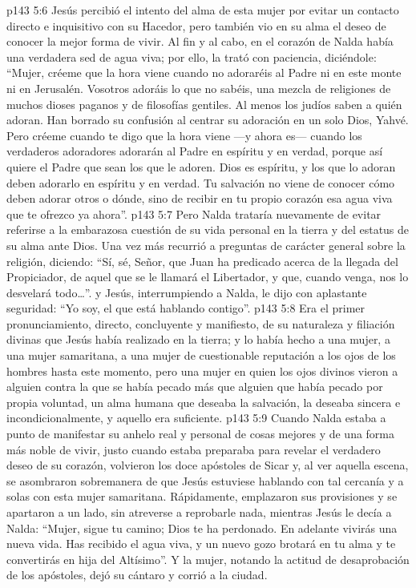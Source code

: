 \vs p143 5:6 Jesús percibió el intento del alma de esta mujer por evitar un contacto directo e inquisitivo con su Hacedor, pero también vio en su alma el deseo de conocer la mejor forma de vivir. Al fin y al cabo, en el corazón de Nalda había una verdadera sed de agua viva; por ello, la trató con paciencia, diciéndole: “Mujer, créeme que la hora viene cuando no adoraréis al Padre ni en este monte ni en Jerusalén. Vosotros adoráis lo que no sabéis, una mezcla de religiones de muchos dioses paganos y de filosofías gentiles. Al menos los judíos saben a quién adoran. Han borrado su confusión al centrar su adoración en un solo Dios, Yahvé. Pero créeme cuando te digo que la hora viene ---y ahora es--- cuando los verdaderos adoradores adorarán al Padre en espíritu y en verdad, porque así quiere el Padre que sean los que le adoren. Dios es espíritu, y los que lo adoran deben adorarlo en espíritu y en verdad. Tu salvación no viene de conocer cómo deben adorar otros o dónde, sino de recibir en tu propio corazón esa agua viva que te ofrezco ya ahora”.
\vs p143 5:7 Pero Nalda trataría nuevamente de evitar referirse a la embarazosa cuestión de su vida personal en la tierra y del estatus de su alma ante Dios. Una vez más recurrió a preguntas de carácter general sobre la religión, diciendo: “Sí, sé, Señor, que Juan ha predicado acerca de la llegada del Propiciador, de aquel que se le llamará el Libertador, y que, cuando venga, nos lo desvelará todo\ldots ”. y Jesús, interrumpiendo a Nalda, le dijo con aplastante seguridad: “Yo soy, el que está hablando contigo”.
\vs p143 5:8 Era el primer pronunciamiento, directo, concluyente y manifiesto, de su naturaleza y filiación divinas que Jesús había realizado en la tierra; y lo había hecho a una mujer, a una mujer samaritana, a una mujer de cuestionable reputación a los ojos de los hombres hasta este momento, pero una mujer en quien los ojos divinos vieron a alguien contra la que se había pecado más que alguien que había pecado por propia voluntad, un alma humana que  deseaba la salvación, la deseaba sincera e incondicionalmente, y aquello era suficiente.
\vs p143 5:9 Cuando Nalda estaba a punto de manifestar su anhelo real y personal de cosas mejores y de una forma más noble de vivir, justo cuando estaba preparaba para revelar el verdadero deseo de su corazón, volvieron los doce apóstoles de Sicar y, al ver aquella escena, se asombraron sobremanera de que Jesús estuviese hablando con tal cercanía y a solas con esta mujer samaritana. Rápidamente, emplazaron sus provisiones y se apartaron a un lado, sin atreverse a reprobarle nada, mientras Jesús le decía a Nalda: “Mujer, sigue tu camino; Dios te ha perdonado. En adelante vivirás una nueva vida. Has recibido el agua viva, y un nuevo gozo brotará en tu alma y te convertirás en hija del Altísimo”. Y la mujer, notando la actitud de desaprobación de los apóstoles, dejó su cántaro y corrió a la ciudad.
